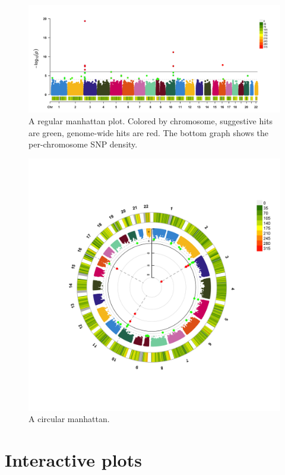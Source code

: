 \documentclass[
]{book}
\begin{document}
\begin{figure}[H]

{\centering \includegraphics[width=0.85\linewidth]{img/_gwas_dummy/show-cmplot-all-manhattan} 

}

\caption{A regular manhattan plot. Colored by chromosome, suggestive hits are green, genome-wide hits are red. The bottom graph shows the per-chromosome SNP density.}\label{fig:showcmplotallmanhattan}
\end{figure}

\begin{figure}[H]

{\centering \includegraphics[width=0.85\linewidth]{img/_gwas_dummy/show-cmplot-all-circular} 

}

\caption{A circular manhattan.}\label{fig:show-cmplot-all-circular}
\end{figure}

\hypertarget{interactive-plots}{%
\section{Interactive plots}\label{interactive-plots}}
\end{document}
